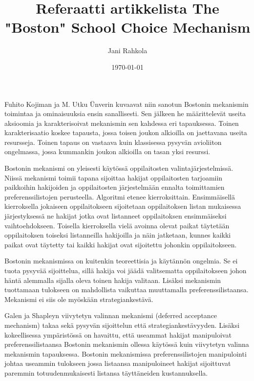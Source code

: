 \documentclass[gradu]{tktltiki}
\begin{document}
\title{Referaatti artikkelista The "Boston" School Choice Mechanism}
\author{Jani Rahkola}
\date{\today}

\maketitle

\doublespacing

\subject{Tietojenkäsittelytiede}


Fuhito Kojiman ja M. Utku Ünverin kuvaavat niin sanotun Bostonin
mekanismin toimintaa ja ominaisuuksia ensin sanallisesti. Sen jälkeen
he määrittelevät useita aksioomia ja karakterisoivat mekanismin sen
kahdessa eri tapauksessa. Toinen karakterisaatio koskee tapausta,
jossa toisen joukon alkioilla on jaettavana useita resursseja. Toinen
tapaus on vastaava kuin klassisessa pysyvän avioliiton ongelmassa,
jossa kummankin joukon alkioilla on tasan yksi resurssi.

Bostonin mekanismi on yleisesti käytössä oppilaitosten
valintajärjestelmissä. Niissä mekanismi toimii tapana sijoittaa
hakijat oppilaitosten tarjoamiin paikkoihin hakijoiden ja
oppilaitosten järjestelmään ennalta toimittamien preferenssilistojen
perusteella. Algoritmi etenee kierroksittain. Ensimmäisellä
kierroksella jokaiseen oppilaitokseen sijoitetaan oppilaitoksen listan
mukaisessa järjestyksessä ne hakijat jotka ovat listanneet
oppilaitoksen ensimmäiseksi vaihtoehdokseen. Toisella kierroksella
vielä avoinna olevat paikat täytetään oppilaitoksen toiseksi
listanneilla hakijoilla ja näin jatketaan, kunnes kaikki paikat ovat
täytetty tai kaikki hakijat ovat sijoitettu johonkin oppilaitokseen.

Bostonin mekanismissa on kuitenkin teoreettisia ja käytännön ongelmia.
Se ei tuota pysyvää sijoittelua, sillä hakija voi jäädä valitsematta
oppilaitokseen johon häntä alemmalla sijalla oleva toinen hakija
valitaan. Lisäksi mekanismin tuottamaan tulokseen on mahdollista
vaikuttaa muuttamalla preferenssilistaansa. Mekanismi ei siis ole
myöskään strategiankestävä.

Galen ja Shapleyn viivytetyn valinnan mekanismi (deferred acceptance
mechanism) takaa sekä pysyvän sijoittelun että strategiankestävyyden.
Lisäksi kokeellisessa ympäristössä on havaittu, että useammat hakijat
manipuloivat preferenssilistaansa Bostonin mekanismin ollessa käytössä
kuin viivytetyn valinna mekanismin tapauksessa. Bostonin mekanismissa
preferenssilistojen manipulointi johtaa useammin tulokseen jossa
listaansa manipuloineet hakijat sijoittuvat paremmin
totuudenmukaisesti listansa täyttäneiden kustannuksella.
\end{document}

